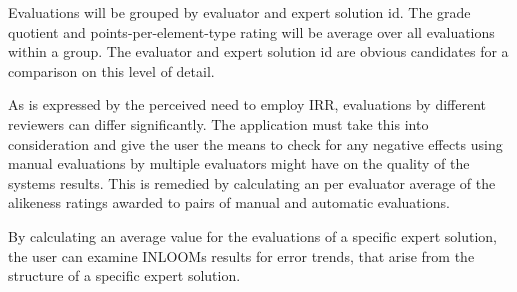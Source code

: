 Evaluations will be grouped by evaluator and expert solution id. The grade quotient and 
points-per-element-type rating will be average over all evaluations within a group. 
The evaluator and expert solution id are obvious candidates for a comparison on this level 
of detail. 

As is expressed by the perceived need to employ IRR, evaluations by different reviewers can 
differ significantly. The application must take this into consideration and give the user the 
means to check for any negative effects using manual evaluations by multiple evaluators might 
have on the quality of the systems results. This is remedied by calculating an per evaluator
average of the alikeness ratings awarded to pairs of manual and automatic evaluations.

By calculating an average value for the evaluations of a specific expert solution, the user 
can examine INLOOMs results for error trends, that arise from the structure of a specific 
expert solution. 